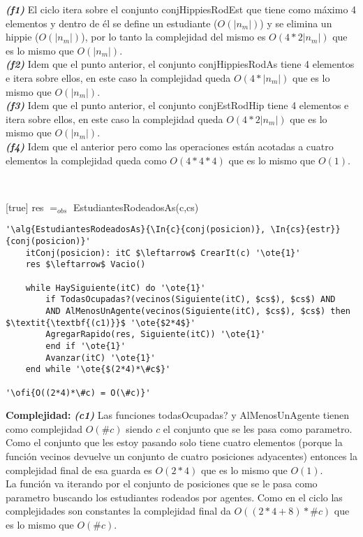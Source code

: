 \textit{\textbf{(f1)}} El ciclo itera sobre el conjunto conjHippiesRodEst que tiene como máximo 4 elementos y dentro de él se define un estudiante ($O(|n_m|)$) y se elimina un hippie ($O(|n_m|)$), por lo tanto la complejidad del mismo es $O(4*2|n_m|)$ que es lo mismo que $O(|n_m|)$. \\
\textit{\textbf{(f2)}} Idem que el punto anterior, el conjunto conjHippiesRodAs tiene 4 elementos e itera sobre ellos, en este caso la complejidad queda $O(4*|n_m|)$ que es lo mismo que  $O(|n_m|)$. \\
\textit{\textbf{(f3)}} Idem que el punto anterior, el conjunto conjEstRodHip tiene 4 elementos e itera sobre ellos, en este caso la complejidad queda $O(4*2|n_m|)$ que es lo mismo que  $O(|n_m|)$. \\
\textit{\textbf{(f4)}} Idem que el anterior pero como las operaciones están acotadas a cuatro elementos la complejidad queda como $O(4*4*4)$ que es lo mismo que $O(1)$.

~


[true]
{res $=_{obs}$ EstudiantesRodeadosAs(c,cs)}

\begin{lstlisting}[mathescape]
'\alg{EstudiantesRodeadosAs}{\In{c}{conj(posicion)}, \In{cs}{estr}}{conj(posicion)}'
	itConj(posicion): itC $\leftarrow$ CrearIt(c) '\ote{1}'
	res $\leftarrow$ Vacio()

	while HaySiguiente(itC) do '\ote{1}'
		if TodasOcupadas?(vecinos(Siguiente(itC), $cs$), $cs$) AND
		AND AlMenosUnAgente(vecinos(Siguiente(itC), $cs$), $cs$) then $\textit{\textbf{(c1)}}$ '\ote{$2*4$}'
		AgregarRapido(res, Siguiente(itC)) '\ote{1}'
		end if '\ote{1}'
		Avanzar(itC) '\ote{1}'
	end while '\ote{$(2*4)*\#c$}'

'\ofi{O((2*4)*\#c) = O(\#c)}'
\end{lstlisting}

\textbf{Complejidad:} \textit{\textbf{(c1)}} Las funciones todasOcupadas? y AlMenosUnAgente tienen como complejidad $O(\#c)$ siendo $c$ el conjunto que se les pasa como parametro. Como el conjunto que les estoy pasando solo tiene cuatro elementos (porque la función vecinos devuelve un conjunto de cuatro posiciones adyacentes) entonces la complejidad final de esa guarda es $O(2*4)$ que es lo mismo que $O(1)$. \\
La función va iterando por el conjunto de posiciones que se le pasa como parametro buscando los estudiantes rodeados por agentes. Como en el ciclo las complejidades son constantes la complejidad final da $O((2*4+8)*\#c)$ que es lo mismo que $O(\#c)$.


